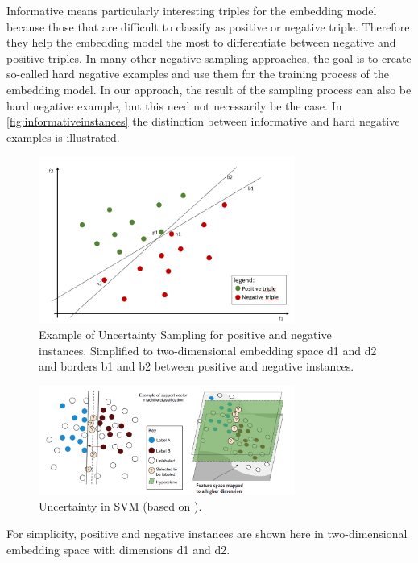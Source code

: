 Informative means particularly interesting triples for the embedding model because those that are difficult to classify as positive or negative triple.
Therefore they help the embedding model the most to differentiate between negative and positive triples.
In many other negative sampling approaches, the goal is to create so-called hard negative examples and use them for the training process of the embedding model. 
In our approach, the result of the sampling process can also be hard negative example, but this need not necessarily be the case.
In \autoref{fig:informativeinstances} the distinction between informative and hard negative examples is illustrated.
\begin{figure}[t]
  \centering
    \includegraphics[width=0.75\textwidth]{figures/informative_instances.PNG}
  \caption{Example of Uncertainty Sampling for positive and negative instances. Simplified to two-dimensional embedding space d1 and d2 and borders b1 and b2 between positive and negative instances.}
  \label{fig:informativeinstances}
\end{figure}
\begin{figure}[t]
  \centering
    \includegraphics[width=0.75\textwidth]{figures/uncertainty_in_svm.PNG}
  \caption{Uncertainty in SVM (based on \cite{human-in-the-loop}).}
  \label{fig:uncertainty_in_svm}
\end{figure}
For simplicity, positive and negative instances are shown here in two-dimensional embedding space with dimensions d1 and d2.
